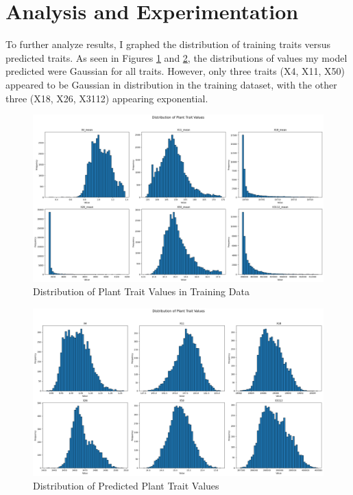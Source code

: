 \documentclass{article}
\begin{document}
\section{Analysis and Experimentation}

To further analyze results, I graphed the distribution of training traits versus predicted traits. As seen in Figures \ref{fig:train_dist} and \ref{fig:pred_dist}, the distributions of values my model predicted were Gaussian for all traits. However, only three traits (X4, X11, X50) appeared to be Gaussian in distribution in the training dataset, with the other three (X18, X26, X3112) appearing exponential.

\begin{figure}[h]
    \centering
    \includegraphics[width=\textwidth]{train_distribution.png}
    \caption{Distribution of Plant Trait Values in Training Data}
    \label{fig:train_dist}
\end{figure}

\begin{figure}[h]
    \centering
    \includegraphics[width=\textwidth]{predicted_distribution.png}
    \caption{Distribution of Predicted Plant Trait Values}
    \label{fig:pred_dist}
\end{figure}
\end{document}
